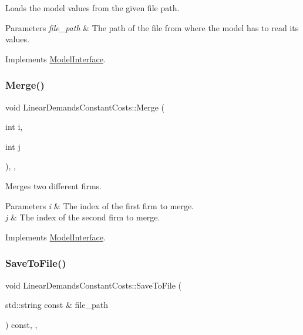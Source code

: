 Loads the model values from the given file path.


\begin{DoxyParams}{Parameters}
{\em file\+\_\+path} & The path of the file from where the model has to read its values. \\
\hline
\end{DoxyParams}


Implements \hyperlink{classModelInterface_a7f408fdb15c10ce8cabf6b942bbc9c38}{Model\+Interface}.

\mbox{\label{classLinearDemandsConstantCosts_a0ee422d927b5a85f9aba8782b02f537b}} 
\subsubsection{\texorpdfstring{Merge()}{Merge()}}
{\footnotesize\ttfamily void Linear\+Demands\+Constant\+Costs\+::\+Merge (\begin{DoxyParamCaption}\item[{int}]{i,  }\item[{int}]{j }\end{DoxyParamCaption})\hspace{0.3cm}{\ttfamily [final]}, {\ttfamily [override]}, {\ttfamily [virtual]}}

Merges two different firms.


\begin{DoxyParams}{Parameters}
{\em i} & The index of the first firm to merge. \\
\hline
{\em j} & The index of the second firm to merge. \\
\hline
\end{DoxyParams}


Implements \hyperlink{classModelInterface_a9aa52643da1fe9e74750e31a6c6ec469}{Model\+Interface}.

\mbox{\label{classLinearDemandsConstantCosts_aef2823751866a4933a8611dd4622d78b}} 
\subsubsection{\texorpdfstring{Save\+To\+File()}{SaveToFile()}}
{\footnotesize\ttfamily void Linear\+Demands\+Constant\+Costs\+::\+Save\+To\+File (\begin{DoxyParamCaption}\item[{std\+::string const \&}]{file\+\_\+path }\end{DoxyParamCaption}) const\hspace{0.3cm}{\ttfamily [final]}, {\ttfamily [override]}, {\ttfamily [virtual]}}


